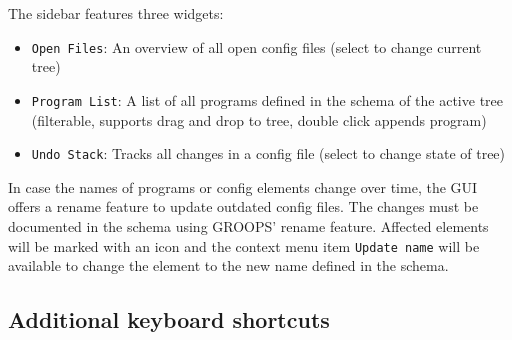 The sidebar features three widgets:
\begin{itemize}
	\item \verb|Open Files|: An overview of all open config files (select to change current tree)
	\item \verb|Program List|: A list of all programs defined in the schema of the active tree (filterable, supports drag and drop to tree, double click appends program)
	\item \verb|Undo Stack|: Tracks all changes in a config file (select to change state of tree)
\end{itemize}

In case the names of programs or config elements change over time, the GUI offers a rename feature to update outdated config files.
The changes must be documented in the schema using GROOPS' rename feature. Affected elements will be marked with an icon and
the context menu item \verb|Update name| will be available to change the element to the new name defined in the schema.

\subsection{Additional keyboard shortcuts}

